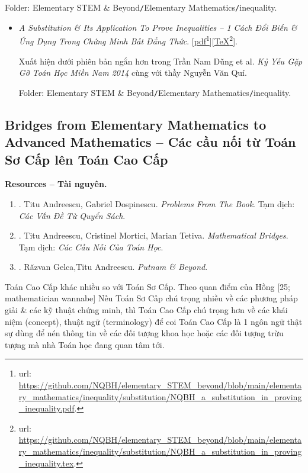 \documentclass[12pt,twoside]{book}
\begin{document}
\begin{enumerate}
	Folder: {\sf Elementary STEM \& Beyond{\tt/}Elementary Mathematics{\tt/}inequality}.
	\begin{itemize}
		\item {\it A Substitution \& Its Application To Prove Inequalities -- 1 Cách Đổi Biến \& Ứng Dụng Trong Chứng Minh Bất Đẳng Thức}. [\href{https://github.com/NQBH/elementary_STEM_beyond/blob/main/elementary_mathematics/inequality/substitution/NQBH_a_substitution_in_proving_inequality.pdf}{pdf}\footnote{{\sc url}: \url{https://github.com/NQBH/elementary_STEM_beyond/blob/main/elementary_mathematics/inequality/substitution/NQBH_a_substitution_in_proving_inequality.pdf}.}][\href{https://github.com/NQBH/elementary_STEM_beyond/blob/main/elementary_mathematics/inequality/substitution/NQBH_a_substitution_in_proving_inequality.tex}{\TeX}\footnote{{\sc url}: \url{https://github.com/NQBH/elementary_STEM_beyond/blob/main/elementary_mathematics/inequality/substitution/NQBH_a_substitution_in_proving_inequality.tex}.}].
		
		Xuất hiện dưới phiên bản ngắn hơn trong {\sc Trần Nam Dũng} et al. {\it Kỷ Yếu Gặp Gỡ Toán Học Miền Nam 2014} cùng với thầy {\sc Nguyễn Văn Quí}.
		
		Folder: {\sf Elementary STEM \& Beyond{\tt/}Elementary Mathematics{\tt/}inequality}.
	\end{itemize}
\end{enumerate}

\subsection{Bridges from Elementary Mathematics to Advanced Mathematics -- Các cầu nối từ Toán Sơ Cấp lên Toán Cao Cấp}
{\bf \textsf{Resources -- Tài nguyên.}}
\begin{enumerate}
	\item \cite{Andreescu_Dospinescu2010}. {\sc Titu Andreescu, Gabriel Dospinescu}. {\it Problems From The Book}. {\sf Tạm dịch}: {\it Các Vấn Đề Từ Quyển Sách}.
	\item \cite{Andreescu_Mortici_Tetiva2017}. {\sc Titu Andreescu, Cristinel Mortici, Marian Tetiva}. {\it Mathematical Bridges}. {\sf Tạm dịch}: {\it Các Cầu Nối Của Toán Học}.
	\item \cite{Gelca_Andreescu2017}. {\sc R\u{a}zvan Gelca,Titu Andreescu}. {\it Putnam \& Beyond}.
\end{enumerate}
Toán Cao Cấp khác nhiều so với Toán Sơ Cấp. Theo quan điểm của {\sf Hồng [25; mathematician wannabe]} Nếu Toán Sơ Cấp chú trọng nhiều về các phương pháp giải \& các kỹ thuật chứng minh, thì Toán Cao Cấp chú trọng hơn về các khái niệm (concept), thuật ngữ (terminology) để coi Toán Cao Cấp là 1 ngôn ngữ thật sự dùng để nén thông tin về các đối tượng khoa học hoặc các đối tượng trừu tượng mà nhà Toán học đang quan tâm tới.
\end{document}
